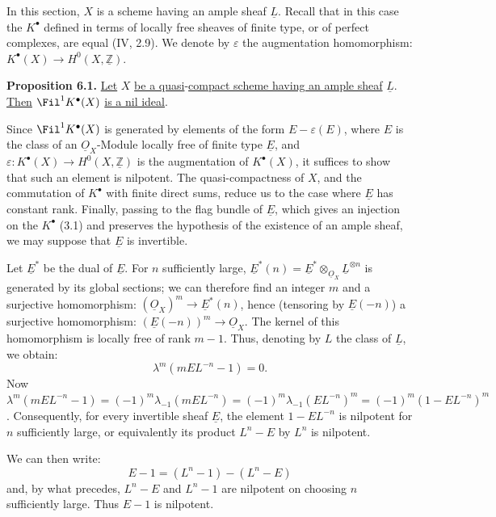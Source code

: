 In this section, $X$ is a scheme having an ample sheaf $\underline{L}$. Recall that in this case the $K^{\bullet}$ defined in terms of locally free sheaves of finite type, or of perfect complexes, are equal (IV, 2.9). We denote by
%
$\varepsilon$ the augmentation homomorphism: $K^{\bullet}(X)\longrightarrow H^0(X,\underline{\mathbb Z})$.

\textbf{Proposition 6.1.} \uline{Let} $X$ \uline{be a quasi}-\uline{compact scheme having an ample sheaf} $\underline{L}$. \uline{Then} $\Fil^1K^{\bullet}(X)$ \uline{is a nil ideal}.

Since $\Fil^1K^{\bullet}(X)$ is generated by elements of the form $E-\varepsilon(E)$, where $E$ is the class of an $\underline{O}_X$-Module locally free of finite type $\underline{E}$, and $\varepsilon:K^{\bullet}(X)\to H^0(X,\underline{\mathbb Z})$ is the augmentation of $K^{\bullet}(X)$, it suffices to show that such an element is nilpotent. The quasi-compactness of $X$, and the commutation of $K^{\bullet}$ with finite direct sums, reduce us to the case where $\underline{E}$ has constant rank. Finally, passing to the flag bundle of $\underline{E}$, which gives an injection on the $K^{\bullet}$ (3.1) and preserves the hypothesis of the existence of an ample sheaf, we may suppose that $\underline{E}$ is invertible.

Let $\underline{E}^*$ be the dual of $\underline{E}$. For $n$ sufficiently large, $\underline{E}^*(n)=\underline{E}^*\otimes_{\underline{O}_X}\underline{L}^{\otimes n}$ is generated by its global sections; we can therefore find an integer $m$ and a surjective homomorphism: $(\underline{O}_X)^m\longrightarrow \underline{E}^*(n)$, hence (tensoring by $\underline{E}(-n)$) a surjective homomorphism: $(\underline{E}(-n))^m\longrightarrow\underline{O}_X$. The kernel of this homomorphism is locally free of rank $m-1$. Thus, denoting by $L$ the class of $\underline{L}$, we obtain:
\[
  \lambda^m(mEL^{-n}-1)=0 .
\]
Now $\lambda^m(mEL^{-n}-1)=(-1)^m\lambda_{-1}(mEL^{-n})=(-1)^m\lambda_{-1}(EL^{-n})^m=(-1)^m(1-EL^{-n})^m$. Consequently, for every invertible sheaf $\underline{E}$, the element $1-EL^{-n}$ is nilpotent for $n$ sufficiently large, or equivalently its product $L^n-E$ by $L^n$ is nilpotent.

We can then write:
\[
  E-1=(L^n-1)-(L^n-E)
\]
and, by what precedes, $L^n-E$ and $L^n-1$ are nilpotent on choosing $n$ sufficiently large. Thus $E-1$ is nilpotent.


